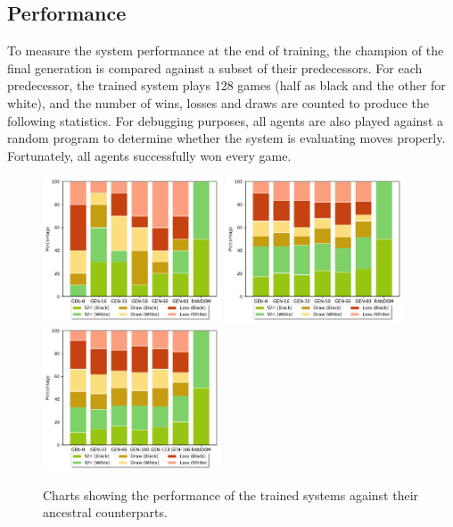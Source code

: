 \documentclass[12pt,a4paper]{article}
\begin{document}
    \subsection{Performance}
    To measure the system performance at the end of training, the champion of the final generation is compared against a subset of their predecessors. For each predecessor, the trained system plays 128 games (half as black and the other for white), and the number of wins, losses and draws are counted to produce the following statistics. For debugging purposes, all agents are also played against a random program to determine whether the system is evaluating moves properly. Fortunately, all agents successfully won every game.
    \begin{figure}[!ht]
        \centering
        \includegraphics[width=53mm]{images/results/1ply/gm_net_stats.pdf}
        \includegraphics[width=53mm]{images/results/3ply/gm_net_stats.pdf}
        \includegraphics[width=53mm]{images/results/6ply/gm_net_stats.pdf}
        \caption{Charts showing the performance of the trained systems against their ancestral counterparts.\label{net_stats}}
    \end{figure}
    
\end{document}
